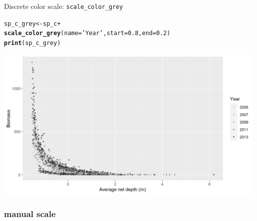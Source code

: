 \documentclass{beamer}\usepackage[]{graphicx}\usepackage[]{color}
\makeatletter
\newcommand{\hlnum}[1]{\textcolor[rgb]{0.686,0.059,0.569}{#1}}%
\newcommand{\hlstr}[1]{\textcolor[rgb]{0.192,0.494,0.8}{#1}}%
\newcommand{\hlopt}[1]{\textcolor[rgb]{0,0,0}{#1}}%
\newcommand{\hlstd}[1]{\textcolor[rgb]{0.345,0.345,0.345}{#1}}%
\newcommand{\hlkwb}[1]{\textcolor[rgb]{0.69,0.353,0.396}{#1}}%
\newcommand{\hlkwc}[1]{\textcolor[rgb]{0.333,0.667,0.333}{#1}}%
\newcommand{\hlkwd}[1]{\textcolor[rgb]{0.737,0.353,0.396}{\textbf{#1}}}%
\newenvironment{kframe}{%
 \def\at@end@of@kframe{}%
 \ifinner\ifhmode%
  \def\at@end@of@kframe{\end{minipage}}%
  \begin{minipage}{\columnwidth}%
 \fi\fi%
 \def\FrameCommand##1{\hskip\@totalleftmargin \hskip-\fboxsep
 \colorbox{shadecolor}{##1}\hskip-\fboxsep
     \hskip-\linewidth \hskip-\@totalleftmargin \hskip\columnwidth}%
 \MakeFramed {\advance\hsize-\width
   \@totalleftmargin\z@ \linewidth\hsize
   \@setminipage}}%
 {\par\unskip\endMakeFramed%
 \at@end@of@kframe}
\newenvironment{knitrout}{}{} %
\makeatother
\begin{document}
\begin{frame}[fragile]{Discrete color scale: \lstinline{scale_color_grey}}
\begin{knitrout}\footnotesize
{}\color{fgcolor}\begin{kframe}
\begin{alltt}
\hlstd{sp_c_grey} \hlkwb{<-} \hlstd{sp_c} \hlopt{+}
  \hlkwd{scale_color_grey}\hlstd{(}\hlkwc{name}\hlstd{=}\hlstr{'Year'}\hlstd{,} \hlkwc{start}\hlstd{=}\hlnum{0.8}\hlstd{,} \hlkwc{end}\hlstd{=}\hlnum{0.2}\hlstd{)}
\hlkwd{print}\hlstd{(sp_c_grey)}
\end{alltt}
\end{kframe}

{\centering \includegraphics[width=.9\linewidth]{figure/sp_discrete_color6-1} 

}



\end{knitrout}
\end{frame}

\subsubsection{manual scale}
\end{document}
